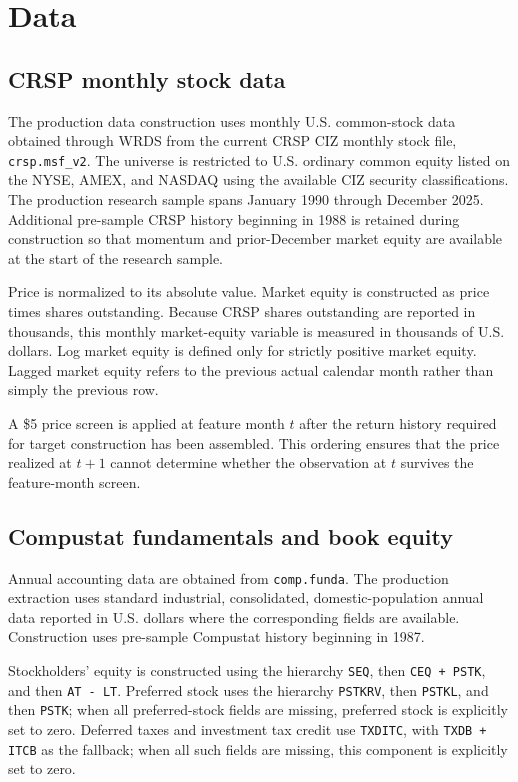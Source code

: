 \section{Data}

\subsection{CRSP monthly stock data}

The production data construction uses monthly U.S. common-stock data obtained through WRDS from the current CRSP CIZ monthly stock file, \texttt{crsp.msf\_v2}. The universe is restricted to U.S. ordinary common equity listed on the NYSE, AMEX, and NASDAQ using the available CIZ security classifications. The production research sample spans January 1990 through December 2025. Additional pre-sample CRSP history beginning in 1988 is retained during construction so that momentum and prior-December market equity are available at the start of the research sample.

Price is normalized to its absolute value. Market equity is constructed as price times shares outstanding. Because CRSP shares outstanding are reported in thousands, this monthly market-equity variable is measured in thousands of U.S. dollars. Log market equity is defined only for strictly positive market equity. Lagged market equity refers to the previous actual calendar month rather than simply the previous row.

A \$5 price screen is applied at feature month $t$ after the return history required for target construction has been assembled. This ordering ensures that the price realized at $t+1$ cannot determine whether the observation at $t$ survives the feature-month screen.

\subsection{Compustat fundamentals and book equity}

Annual accounting data are obtained from \texttt{comp.funda}. The production extraction uses standard industrial, consolidated, domestic-population annual data reported in U.S. dollars where the corresponding fields are available. Construction uses pre-sample Compustat history beginning in 1987.

Stockholders' equity is constructed using the hierarchy \texttt{SEQ}, then \texttt{CEQ + PSTK}, and then \texttt{AT - LT}. Preferred stock uses the hierarchy \texttt{PSTKRV}, then \texttt{PSTKL}, and then \texttt{PSTK}; when all preferred-stock fields are missing, preferred stock is explicitly set to zero. Deferred taxes and investment tax credit use \texttt{TXDITC}, with \texttt{TXDB + ITCB} as the fallback; when all such fields are missing, this component is explicitly set to zero.

